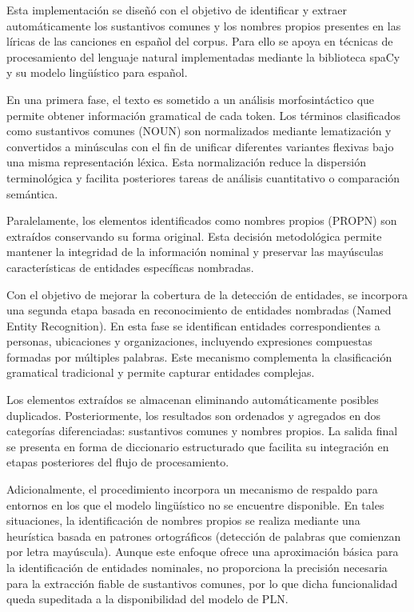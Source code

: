 Esta implementación se diseñó con el objetivo de identificar y extraer automáticamente los sustantivos comunes y los nombres propios presentes en las líricas de las canciones en español del corpus. Para ello se apoya en técnicas de procesamiento del lenguaje natural implementadas mediante la biblioteca spaCy y su modelo lingüístico para español.

En una primera fase, el texto es sometido a un análisis morfosintáctico que permite obtener información gramatical de cada token. Los términos clasificados como sustantivos comunes (NOUN) son normalizados mediante lematización y convertidos a minúsculas con el fin de unificar diferentes variantes flexivas bajo una misma representación léxica. Esta normalización reduce la dispersión terminológica y facilita posteriores tareas de análisis cuantitativo o comparación semántica.

Paralelamente, los elementos identificados como nombres propios (PROPN) son extraídos conservando su forma original. Esta decisión metodológica permite mantener la integridad de la información nominal y preservar las mayúsculas características de entidades específicas nombradas.

Con el objetivo de mejorar la cobertura de la detección de entidades, se incorpora una segunda etapa basada en reconocimiento de entidades nombradas (Named Entity Recognition). En esta fase se identifican entidades correspondientes a personas, ubicaciones y organizaciones, incluyendo expresiones compuestas formadas por múltiples palabras. Este mecanismo complementa la clasificación gramatical tradicional y permite capturar entidades complejas.

Los elementos extraídos se almacenan eliminando automáticamente posibles duplicados. Posteriormente, los resultados son ordenados y agregados en dos categorías diferenciadas: sustantivos comunes y nombres propios. La salida final se presenta en forma de diccionario estructurado que facilita su integración en etapas posteriores del flujo de procesamiento.

Adicionalmente, el procedimiento incorpora un mecanismo de respaldo para entornos en los que el modelo lingüístico no se encuentre disponible. En tales situaciones, la identificación de nombres propios se realiza mediante una heurística basada en patrones ortográficos (detección de palabras que comienzan por letra mayúscula). Aunque este enfoque ofrece una aproximación básica para la identificación de entidades nominales, no proporciona la precisión necesaria para la extracción fiable de sustantivos comunes, por lo que dicha funcionalidad queda supeditada a la disponibilidad del modelo de PLN.

